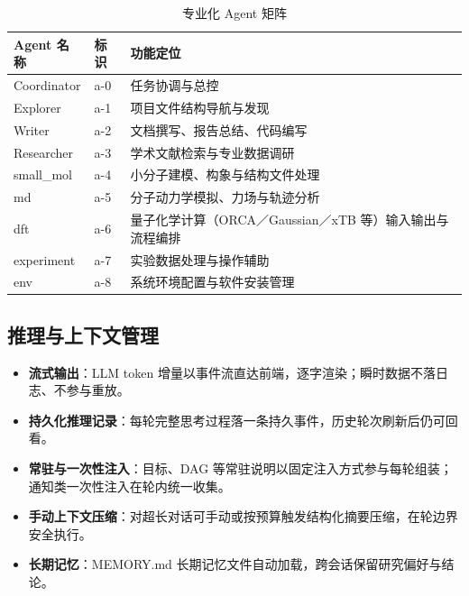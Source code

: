\documentclass[zihao=-4,a4paper,fontset=none]{ctexart}
\begin{document}
\begin{table}[htbp]
  \centering
  \caption{专业化 Agent 矩阵}
  \label{tab:agents}
  \begin{tabular}{ll>{\raggedright\arraybackslash}p{8.5cm}}
    \toprule
    Agent 名称 & 标识 & 功能定位 \\
    \midrule
    Coordinator & a-0 & 任务协调与总控 \\
    Explorer & a-1 & 项目文件结构导航与发现 \\
    Writer & a-2 & 文档撰写、报告总结、代码编写 \\
    Researcher & a-3 & 学术文献检索与专业数据调研 \\
    small\_mol & a-4 & 小分子建模、构象与结构文件处理 \\
    md & a-5 & 分子动力学模拟、力场与轨迹分析 \\
    dft & a-6 & 量子化学计算（ORCA／Gaussian／xTB 等）输入输出与流程编排 \\
    experiment & a-7 & 实验数据处理与操作辅助 \\
    env & a-8 & 系统环境配置与软件安装管理 \\
    \bottomrule
  \end{tabular}
\end{table}

\subsection{推理与上下文管理}
\begin{itemize}[itemsep=2pt]
  \item \textbf{流式输出}：LLM token 增量以事件流直达前端，逐字渲染；瞬时数据不落日志、不参与重放。
  \item \textbf{持久化推理记录}：每轮完整思考过程落一条持久事件，历史轮次刷新后仍可回看。
  \item \textbf{常驻与一次性注入}：目标、DAG 等常驻说明以固定注入方式参与每轮组装；通知类一次性注入在轮内统一收集。
  \item \textbf{手动上下文压缩}：对超长对话可手动或按预算触发结构化摘要压缩，在轮边界安全执行。
  \item \textbf{长期记忆}：MEMORY.md 长期记忆文件自动加载，跨会话保留研究偏好与结论。
\end{itemize}
\end{document}
